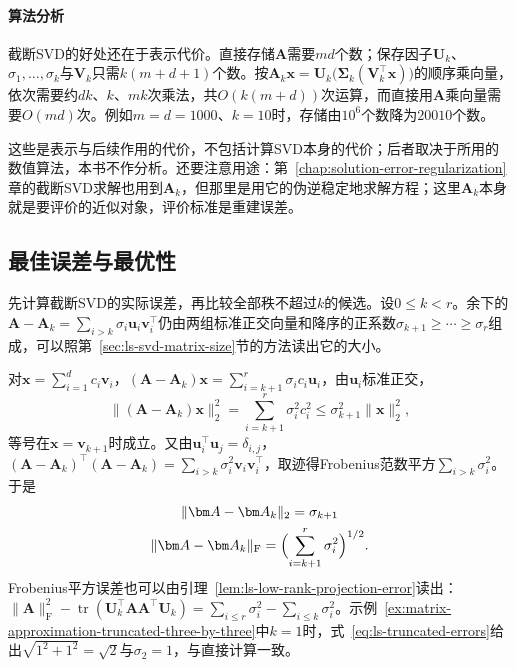 \paragraph{算法分析}

截断SVD的好处还在于表示代价。直接存储$\bm A$需要$md$个数；保存因子$\bm U_k$、$\sigma_1,\ldots,\sigma_k$与$\bm V_k$只需$k(m+d+1)$个数。按$\bm A_k\bm x=\bm U_k\bigl(\bm\Sigma_k(\bm V_k^\top\bm x)\bigr)$的顺序乘向量，依次需要约$dk$、$k$、$mk$次乘法，共$O(k(m+d))$次运算，而直接用$\bm A$乘向量需要$O(md)$次。例如$m=d=1000$、$k=10$时，存储由$10^6$个数降为$20010$个数。

这些是表示与后续作用的代价，不包括计算SVD本身的代价；后者取决于所用的数值算法，本书不作分析。还要注意用途：第~\ref{chap:solution-error-regularization}章的截断SVD求解也用到$\bm A_k$，但那里是用它的伪逆稳定地求解方程；这里$\bm A_k$本身就是要评价的近似对象，评价标准是重建误差。

\subsection{最佳误差与最优性}
\label{sec:ls-truncated-svd-optimality}

先计算截断SVD的实际误差，再比较全部秩不超过$k$的候选。设$0\leq k<r$。余下的$\bm A-\bm A_k=\sum_{i>k}\sigma_i\bm u_i\bm v_i^\top$仍由两组标准正交向量和降序的正系数$\sigma_{k+1}\geq\cdots\geq\sigma_r$组成，可以照第~\ref{sec:ls-svd-matrix-size}节的方法读出它的大小。

对$\bm x=\sum_{i=1}^dc_i\bm v_i$，$(\bm A-\bm A_k)\bm x=\sum_{i=k+1}^r\sigma_ic_i\bm u_i$，由$\bm u_i$标准正交，
\[
 \lVert(\bm A-\bm A_k)\bm x\rVert_2^2=\sum_{i=k+1}^r\sigma_i^2c_i^2\leq\sigma_{k+1}^2\lVert\bm x\rVert_2^2,
\]
等号在$\bm x=\bm v_{k+1}$时成立。又由$\bm u_i^\top\bm u_j=\delta_{i,j}$，$(\bm A-\bm A_k)^\top(\bm A-\bm A_k)=\sum_{i>k}\sigma_i^2\bm v_i\bm v_i^\top$，取迹得Frobenius范数平方$\sum_{i>k}\sigma_i^2$。于是
\begin{equation}
\begin{gathered}
\lVert\bm A-\bm A_k\rVert_2=\sigma_{k+1}\\
\lVert\bm A-\bm A_k\rVert_{\mathrm F}
 =\Bigl(\sum_{i=k+1}^r\sigma_i^2\Bigr)^{1/2}.
\end{gathered}
\label{eq:ls-truncated-errors}
\end{equation}
Frobenius平方误差也可以由引理~\ref{lem:ls-low-rank-projection-error}读出：$\lVert\bm A\rVert_{\mathrm F}^2-\operatorname{tr}(\bm U_k^\top\bm A\bm A^\top\bm U_k)=\sum_{i\leq r}\sigma_i^2-\sum_{i\leq k}\sigma_i^2$。示例~\ref{ex:matrix-approximation-truncated-three-by-three}中$k=1$时，式~\eqref{eq:ls-truncated-errors}给出$\sqrt{1^2+1^2}=\sqrt2$与$\sigma_2=1$，与直接计算一致。

